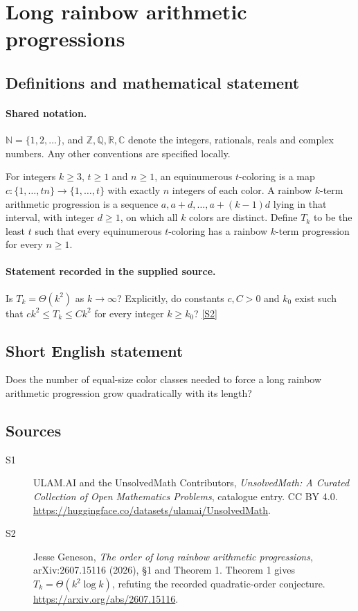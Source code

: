 \documentclass[11pt]{article}
\newcommand{\sref}[2]{\hyperlink{source:#1:#2}{[S#2]}}
\begin{document}
\section{Long rainbow arithmetic progressions}\label{statement}

\subsection{Definitions and mathematical statement}

\paragraph{Shared notation.}$\mathbb N=\{1,2,\ldots\}$, and $\mathbb Z,\mathbb Q,\mathbb R,\mathbb C$ denote the integers, rationals, reals and complex numbers. Any other conventions are specified locally.


For integers $k\geq3$, $t\geq1$ and $n\geq1$, an equinumerous $t$-coloring is a map $c:\{1,\ldots,tn\}\to\{1,\ldots,t\}$ with exactly $n$ integers of each color. A rainbow $k$-term arithmetic progression is a sequence $a,a+d,\ldots,a+(k-1)d$ lying in that interval, with integer $d\geq1$, on which all $k$ colors are distinct. Define $T_k$ to be the least $t$ such that every equinumerous $t$-coloring has a rainbow $k$-term progression for every $n\geq1$.
\paragraph{Statement recorded in the supplied source.}
Is $T_k=\Theta(k^2)$ as $k\to\infty$? Explicitly, do constants $c,C>0$ and $k_0$ exist such that $ck^2\leq T_k\leq Ck^2$ for every integer $k\geq k_0$? \sref{statement}{2}
\subsection{Short English statement}
Does the number of equal-size color classes needed to force a long rainbow arithmetic progression grow quadratically with its length?
\subsection{Sources}
\begin{description}
\item[\hypertarget{source:statement:1}{S1}] ULAM.AI and the UnsolvedMath Contributors, \emph{UnsolvedMath: A Curated Collection of Open Mathematics Problems}, catalogue entry. CC BY 4.0. \url{https://huggingface.co/datasets/ulamai/UnsolvedMath}.
\item[\hypertarget{source:statement:2}{S2}] Jesse Geneson, \emph{The order of long rainbow arithmetic progressions}, arXiv:2607.15116 (2026), §1 and Theorem 1. Theorem 1 gives $T_k=\Theta(k^2\log k)$, refuting the recorded quadratic-order conjecture. \url{https://arxiv.org/abs/2607.15116}.
\end{description}
\label{end:statement}
\end{document}
